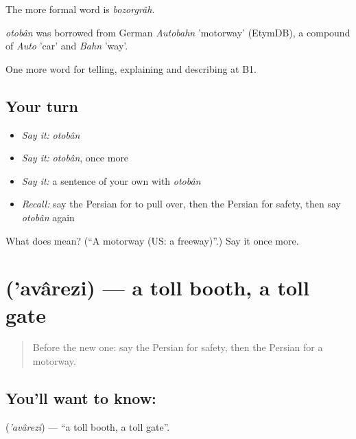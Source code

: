 The more formal word is \emph{bozorgrâh}.

\begin{cousinweb}
\emph{otobân} was borrowed from German \emph{Autobahn} 'motorway' (EtymDB), a compound of \emph{Auto} 'car' and \emph{Bahn} 'way'.
\end{cousinweb}

\begin{grammarlens}[title={What you've built}]
One more word for telling, explaining and describing at B1.
\end{grammarlens}

\subsection*{Your turn}
\begin{itemize}
\raggedright
  \item \emph{Say it:} \emph{otobân}
  \item \emph{Say it:} \emph{otobân}, once more
  \item \emph{Say it:} a sentence of your own with \emph{otobân}
  \item \emph{Recall:} say the Persian for to pull over, then the Persian for safety, then say \emph{otobân} again
\end{itemize}

\begin{tcolorbox}[breakable,colback=teal!4,colframe=teal!35!black,title={Before you move on}]
What does  mean? (\textquotedblleft{}A motorway (US: a freeway)\textquotedblright{}.) Say it once more.
\end{tcolorbox}
\section[\texorpdfstring{\fa{عوارضی} ('avârezi)}{عوارضی ('avârezi)}]{ ('avârezi) — a toll booth, a toll gate}

\label{lesson:FA-C425-avarezi}



\begin{quote}
Before the new one: say the Persian for safety, then the Persian for a motorway.
\end{quote}

\subsection*{You'll want to know: }
\textbf{} (\emph{'avârezi}) — \textquotedblleft{}a toll booth, a toll gate\textquotedblright{}.

